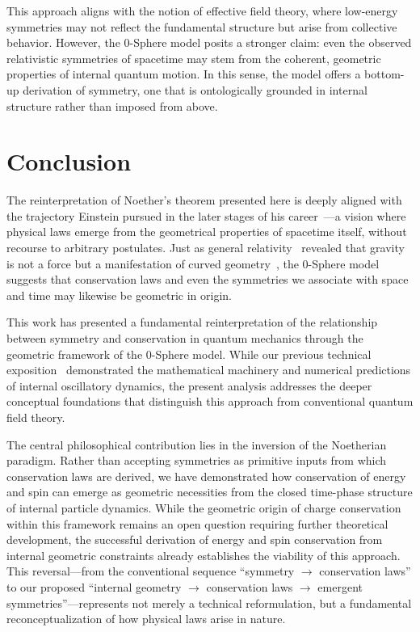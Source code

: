 \documentclass[%
 reprint,
 amsmath,amssymb,
 aps,
]{revtex4-1}
\numberwithin{equation}{section}%
\begin{document}
This approach aligns with the notion of effective field theory, where low-energy symmetries may not reflect the fundamental structure but arise from collective behavior. However, the 0-Sphere model posits a stronger claim: even the observed relativistic symmetries of spacetime may stem from the coherent, geometric properties of internal quantum motion. In this sense, the model offers a bottom-up derivation of symmetry, one that is ontologically grounded in internal structure rather than imposed from above.


\section{Conclusion}
\label{sec:conclusion}

The reinterpretation of Noether's theorem presented here is deeply aligned with the trajectory Einstein pursued in the later stages of his career~\cite{einstein1955}—a vision where physical laws emerge from the geometrical properties of spacetime itself, without recourse to arbitrary postulates. Just as general relativity~\cite{einstein1915} revealed that gravity is not a force but a manifestation of curved geometry~\cite{misner1973}, the 0-Sphere model suggests that conservation laws and even the symmetries we associate with space and time may likewise be geometric in origin.

This work has presented a fundamental reinterpretation of the relationship between symmetry and conservation in quantum mechanics through the geometric framework of the 0-Sphere model. While our previous technical exposition~\cite{hanamura2309.0047} demonstrated the mathematical machinery and numerical predictions of internal oscillatory dynamics, the present analysis addresses the deeper conceptual foundations that distinguish this approach from conventional quantum field theory.

The central philosophical contribution lies in the inversion of the Noetherian paradigm. Rather than accepting symmetries as primitive inputs from which conservation laws are derived, we have demonstrated how conservation of energy and spin can emerge as geometric necessities from the closed time-phase structure of internal particle dynamics. While the geometric origin of charge conservation within this framework remains an open question requiring further theoretical development, the successful derivation of energy and spin conservation from internal geometric constraints already establishes the viability of this approach. This reversal—from the conventional sequence ``symmetry $\rightarrow$ conservation laws'' to our proposed ``internal geometry $\rightarrow$ conservation laws $\rightarrow$ emergent symmetries''—represents not merely a technical reformulation, but a fundamental reconceptualization of how physical laws arise in nature.
\end{document}
